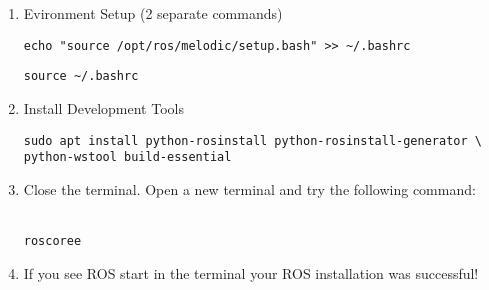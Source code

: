 \documentclass[12pt]{article}
\begin{document}
\begin{enumerate}
\newpage
\item Evironment Setup (2 separate commands) 
\begin{verbatim} 
echo "source /opt/ros/melodic/setup.bash" >> ~/.bashrc
\end{verbatim}
\begin{verbatim} 
source ~/.bashrc 
\end{verbatim}
		
\item Install Development Tools 
\begin{verbatim} 
sudo apt install python-rosinstall python-rosinstall-generator \ 
python-wstool build-essential
\end{verbatim}

		\item Close the terminal. Open a new terminal and try the following command:\\\\
\begin{verbatim}  
roscoree 
\end{verbatim}

		\item If you see ROS start in the terminal your ROS installation was successful!\\\\

\end{enumerate}
\end{document}
